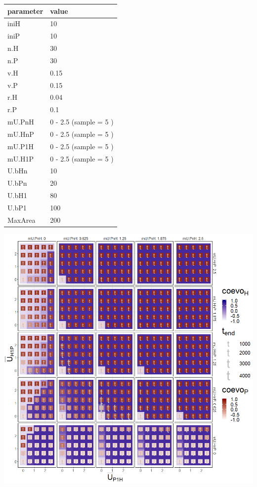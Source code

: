 \documentclass[]{book}
\begin{document}
\begin{tabular}{l|l}
\hline
parameter & value\\
\hline
iniH & 10\\
\hline
iniP & 10\\
\hline
n.H & 30\\
\hline
n.P & 30\\
\hline
v.H & 0.15\\
\hline
v.P & 0.15\\
\hline
r.H & 0.04\\
\hline
r.P & 0.1\\
\hline
mU.PnH & 0 - 2.5 (sample = 5 )\\
\hline
mU.HnP & 0 - 2.5 (sample = 5 )\\
\hline
mU.P1H & 0 - 2.5 (sample = 5 )\\
\hline
mU.H1P & 0 - 2.5 (sample = 5 )\\
\hline
U.bHn & 10\\
\hline
U.bPn & 20\\
\hline
U.bH1 & 80\\
\hline
U.bP1 & 100\\
\hline
MaxArea & 200\\
\hline
\end{tabular}

\newpage

\includegraphics[width=1\linewidth]{plots/4_fourPar-mU.HP-mU.PH_plot}
\end{document}
